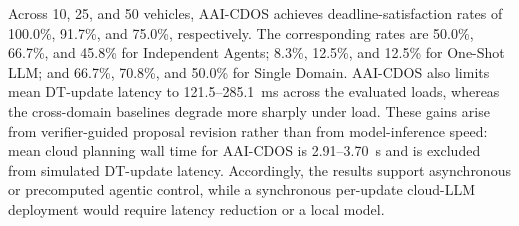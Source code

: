 Across 10, 25, and 50 vehicles, AAI-CDOS achieves deadline-satisfaction rates of 100.0\%, 91.7\%, and 75.0\%, respectively. The corresponding rates are 50.0\%, 66.7\%, and 45.8\% for Independent Agents; 8.3\%, 12.5\%, and 12.5\% for One-Shot LLM; and 66.7\%, 70.8\%, and 50.0\% for Single Domain. AAI-CDOS also limits mean DT-update latency to 121.5--285.1~ms across the evaluated loads, whereas the cross-domain baselines degrade more sharply under load. These gains arise from verifier-guided proposal revision rather than from model-inference speed: mean cloud planning wall time for AAI-CDOS is 2.91--3.70~s and is excluded from simulated DT-update latency. Accordingly, the results support asynchronous or precomputed agentic control, while a synchronous per-update cloud-LLM deployment would require latency reduction or a local model.
